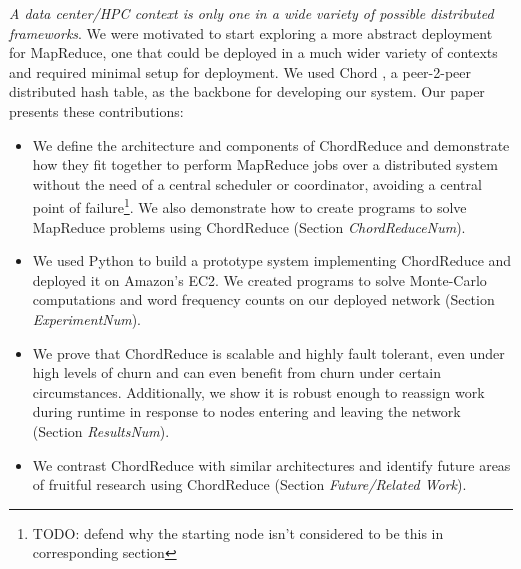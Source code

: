 \documentclass[10pt, conference, compsocconf]{IEEEtran}
\begin{document}
\textit{A data center/HPC context is only one in a wide variety of possible distributed frameworks}.  We were motivated to start exploring a more abstract deployment for MapReduce, one that could be deployed in a much wider variety of contexts and required minimal setup for deployment.  We used Chord \cite{Chord}, a peer-2-peer distributed hash table, as the backbone for developing our system.  Our paper presents these contributions:
\begin{itemize}
	\item We define the architecture and components of ChordReduce and demonstrate how they fit together to perform MapReduce jobs over a distributed system without the need of a central scheduler or coordinator, avoiding a central point of failure\footnote{TODO: defend why the starting node isn't considered to be this in corresponding section}. We also demonstrate how to create programs to solve MapReduce problems using ChordReduce (Section \textit{ChordReduceNum}). 
	\item We used Python to build a prototype system implementing ChordReduce and deployed it on Amazon's EC2. We created programs to solve Monte-Carlo computations and word frequency counts on our deployed network (Section \textit{ExperimentNum}).
	\item We prove that ChordReduce is scalable and highly fault tolerant, even under high levels of churn and can even benefit from churn under certain circumstances. Additionally, we show it is robust enough to reassign work during runtime in response to nodes entering and leaving the network (Section \textit{ResultsNum}).
	\item We contrast ChordReduce with similar architectures and identify future areas of fruitful research using ChordReduce (Section \textit{Future/Related  Work}). 





\end{itemize}
\end{document}
